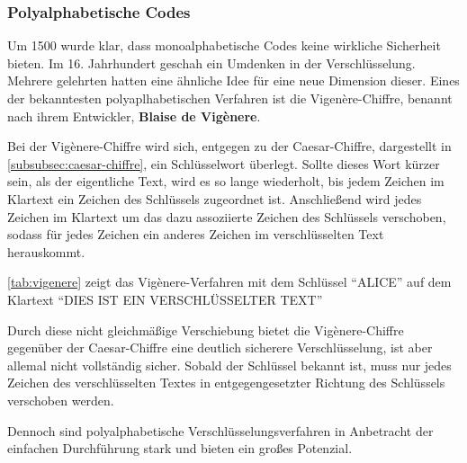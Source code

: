\subsubsection{Polyalphabetische Codes}
Um 1500 wurde klar, dass \gls{monoalphabetisch}e Codes keine wirkliche
Sicherheit bieten. Im 16. Jahrhundert geschah ein Umdenken in der Verschlüsselung.
Mehrere gelehrten hatten eine ähnliche Idee für eine neue Dimension dieser. \autocite[]{beutelspacher_kurze_2017}
Eines der bekanntesten polyaplhabetischen Verfahren ist die Vigenère-Chiffre, benannt
nach ihrem Entwickler, \textbf{Blaise de Vigènere}.

Bei der Vigènere-Chiffre wird sich, entgegen zu der Caesar-Chiffre, dargestellt in \autoref{subsubsec:caesar-chiffre}, ein Schlüsselwort
überlegt. Sollte dieses Wort kürzer sein, als der eigentliche Text, wird es so
lange wiederholt, bis jedem Zeichen im Klartext ein Zeichen des Schlüssels zugeordnet
ist. Anschließend wird jedes Zeichen im Klartext um das dazu assoziierte Zeichen
des Schlüssels verschoben, sodass für jedes Zeichen ein anderes Zeichen im verschlüsselten
Text herauskommt.

\autoref{tab:vigenere}\autocite[]{kryptographische_algorithmen} zeigt das Vigènere-Verfahren mit dem Schlüssel \enquote{ALICE} auf dem Klartext \enquote{DIES IST EIN VERSCHLÜSSELTER TEXT}

\begin{table}[htbp]
	\caption[
	Verschlüsselung mit Vigènere-Verfahren]{Verschlüsselung mit Vigènere-Verfahren\footnotemark}
	\label{tab:vigenere}
\end{table}


Durch diese nicht gleichmäßige Verschiebung bietet die Vigènere-Chiffre gegenüber der Caesar-Chiffre eine deutlich sicherere Verschlüsselung, ist aber allemal nicht vollständig sicher. Sobald der Schlüssel bekannt ist, muss nur jedes Zeichen des verschlüsselten Textes in entgegengesetzter Richtung des Schlüssels verschoben werden.
\par Dennoch sind polyalphabetische Verschlüsselungsverfahren in Anbetracht der einfachen Durchführung stark und bieten ein großes Potenzial.
